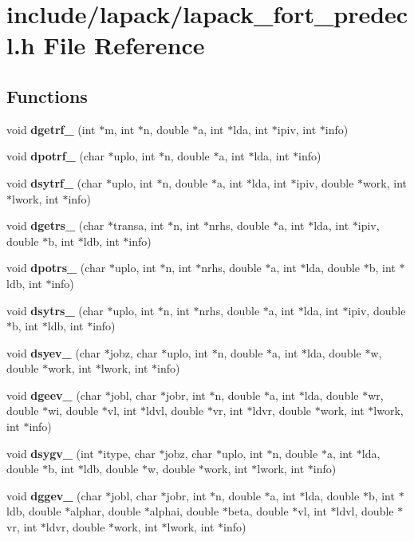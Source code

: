 \section{include/lapack/lapack\-\_\-fort\-\_\-predecl.h File Reference}
\label{d9/dcd/lapack__fort__predecl_8h}
\subsection*{Functions}
\begin{DoxyCompactItemize}
\item 
void {\bf dgetrf\-\_\-} (int $\ast$m, int $\ast$n, double $\ast$a, int $\ast$lda, int $\ast$ipiv, int $\ast$info)
\item 
void {\bf dpotrf\-\_\-} (char $\ast$uplo, int $\ast$n, double $\ast$a, int $\ast$lda, int $\ast$info)
\item 
void {\bf dsytrf\-\_\-} (char $\ast$uplo, int $\ast$n, double $\ast$a, int $\ast$lda, int $\ast$ipiv, double $\ast$work, int $\ast$lwork, int $\ast$info)
\item 
void {\bf dgetrs\-\_\-} (char $\ast$transa, int $\ast$n, int $\ast$nrhs, double $\ast$a, int $\ast$lda, int $\ast$ipiv, double $\ast$b, int $\ast$ldb, int $\ast$info)
\item 
void {\bf dpotrs\-\_\-} (char $\ast$uplo, int $\ast$n, int $\ast$nrhs, double $\ast$a, int $\ast$lda, double $\ast$b, int $\ast$ldb, int $\ast$info)
\item 
void {\bf dsytrs\-\_\-} (char $\ast$uplo, int $\ast$n, int $\ast$nrhs, double $\ast$a, int $\ast$lda, int $\ast$ipiv, double $\ast$b, int $\ast$ldb, int $\ast$info)
\item 
void {\bf dsyev\-\_\-} (char $\ast$jobz, char $\ast$uplo, int $\ast$n, double $\ast$a, int $\ast$lda, double $\ast$w, double $\ast$work, int $\ast$lwork, int $\ast$info)
\item 
void {\bf dgeev\-\_\-} (char $\ast$jobl, char $\ast$jobr, int $\ast$n, double $\ast$a, int $\ast$lda, double $\ast$wr, double $\ast$wi, double $\ast$vl, int $\ast$ldvl, double $\ast$vr, int $\ast$ldvr, double $\ast$work, int $\ast$lwork, int $\ast$info)
\item 
void {\bf dsygv\-\_\-} (int $\ast$itype, char $\ast$jobz, char $\ast$uplo, int $\ast$n, double $\ast$a, int $\ast$lda, double $\ast$b, int $\ast$ldb, double $\ast$w, double $\ast$work, int $\ast$lwork, int $\ast$info)
\item 
void {\bf dggev\-\_\-} (char $\ast$jobl, char $\ast$jobr, int $\ast$n, double $\ast$a, int $\ast$lda, double $\ast$b, int $\ast$ldb, double $\ast$alphar, double $\ast$alphai, double $\ast$beta, double $\ast$vl, int $\ast$ldvl, double $\ast$vr, int $\ast$ldvr, double $\ast$work, int $\ast$lwork, int $\ast$info)

\end{DoxyCompactItemize}
